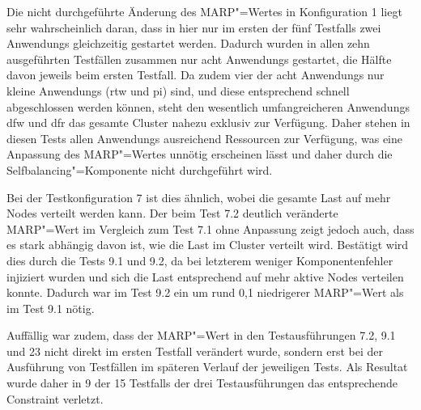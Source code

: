 Die nicht durchgeführte Änderung des \gls{MARP}"=Wertes in Konfiguration 1 liegt sehr wahrscheinlich daran, dass in hier nur im ersten der fünf \glspl{Testfall} zwei \glspl{Anwendung} gleichzeitig gestartet werden.
Dadurch wurden in allen zehn ausgeführten Testfällen zusammen nur acht \glspl{Anwendung} gestartet, die Hälfte davon jeweils beim ersten Testfall.
Da zudem vier der acht \glspl{Anwendung} nur kleine \glspl{Anwendung} (\acrlong{rtw} und \acrlong{pi}) sind, und diese entsprechend schnell abgeschlossen werden können, steht den wesentlich umfangreicheren \glspl{Anwendung} \acrlong{dfw} und \acrlong{dfr} das gesamte Cluster nahezu exklusiv zur Verfügung.
Daher stehen in diesen \glspl{Test} allen \glspl{Anwendung} ausreichend Ressourcen zur Verfügung, was eine Anpassung des \gls{MARP}"=Wertes unnötig erscheinen lässt und daher durch die Selfbalancing"=Komponente nicht durchgeführt wird.

Bei der \gls{Testkonfiguration} 7 ist dies ähnlich, wobei die gesamte Last auf mehr Nodes verteilt werden kann.
Der beim \gls{Test} 7.2 deutlich veränderte \gls{MARP}"=Wert im Vergleich zum \gls{Test} 7.1 ohne Anpassung zeigt jedoch auch, dass es stark abhängig davon ist, wie die Last im Cluster verteilt wird.
Bestätigt wird dies durch die \glspl{Test} 9.1 und 9.2, da bei letzterem weniger Komponentenfehler injiziert wurden und sich die Last entsprechend auf mehr aktive Nodes verteilen konnte.
Dadurch war im \gls{Test} 9.2 ein um rund 0,1 niedrigerer \gls{MARP}"=Wert als im \gls{Test} 9.1 nötig.

Auffällig war zudem, dass der \gls{MARP}"=Wert in den Testausführungen 7.2, 9.1 und 23 nicht direkt im ersten \gls{Testfall} verändert wurde, sondern erst bei der Ausführung von Testfällen im späteren Verlauf der jeweiligen Tests.
Als Resultat wurde daher in 9 der 15 \glspl{Testfall} der drei Testausführungen das entsprechende Constraint verletzt.
